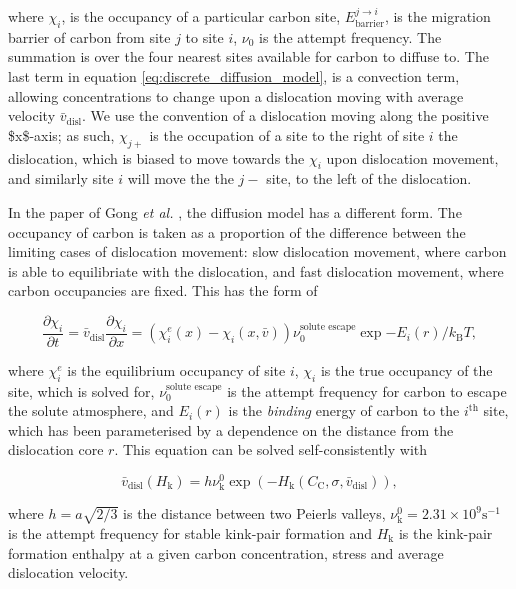 \documentclass[a4paper,12pt,oneside,print,numbered,index,PageStyleIII]{PhDThesisPSnPDF}
\begin{document}
\begin{enumerate}
where \(\chi_i\), is the occupancy of a particular carbon site,
\(E_{\text{barrier}}^{j\rightarrow i}\), is the migration barrier of carbon
from site \(j\) to site \(i\), \(\nu_0\) is the attempt frequency. The summation
is over the four nearest sites available for carbon to diffuse to. The last term
in equation \eqref{eq:discrete_diffusion_model}, is a convection term,
allowing concentrations to change upon a dislocation moving with average velocity
\(\bar{v}_{\text{disl}}\). We use the convention of a dislocation moving along
the positive \$x\$-axis; as such, \(\chi_{j+}\)
is the occupation of a site to the right of site \(i\) the dislocation, which is biased
to move towards the \(\chi_i\) upon dislocation movement, and similarly site
\(i\) will move the the \(j-\) site, to the left of the dislocation.


In the paper of Gong \emph{et al.} \cite{Gong2020}, the diffusion model has a
different form. The occupancy of carbon is
taken as a proportion of the difference between the limiting cases of
dislocation movement: slow dislocation movement, where carbon is able to
equilibriate with the dislocation, and fast dislocation movement, where
carbon occupancies are fixed. This has the form of

\[ \frac{\partial \chi_i}{\partial t} = \bar{v}_{\text{disl} }\frac{\partial
     \chi_i}{\partial x} = \left( \chi_i^e(x) - \chi_i(x,\bar{v})
     \right) \nu_0^{\text{solute escape}} \exp{ - E_i(r) / k_{\text{B}} T}, \label{eq:ivo_diffusion_model} \]

where \(\chi^e_i\) is the equilibrium occupancy of site \(i\), \(\chi_i\) is the
true occupancy of the site, which is solved for, \(\nu_0^{\text{solute
     escape}}\) is the attempt frequency for carbon to escape the solute
atmosphere, and \(E_i(r)\) is the
\emph{binding} energy of carbon to the \(i^{\text{th}}\) site, which has been
parameterised by a dependence on the distance from the dislocation
core \(r\). This equation can be solved self-consistently with

\[ \bar{v}_{\text{disl}}(H_{\text{k}}) = h\nu^0_{\text{k} }
     \exp \left( -H_{\text{k}}(C_{\text{C}}, \sigma, \bar{v}_{\text{disl} }) \right), \]

where \(h = a\sqrt{2/3}\) is the distance between two Peierls valleys,
\(\nu^0_{\text{k} } = 2.31\times 10^{9} \text{s}^{-1}\) is the attempt
frequency for stable kink-pair formation and \(H_{\text{k} }\) is the
kink-pair formation enthalpy at a given carbon concentration, stress and
average dislocation velocity.



\end{enumerate}
\end{document}

